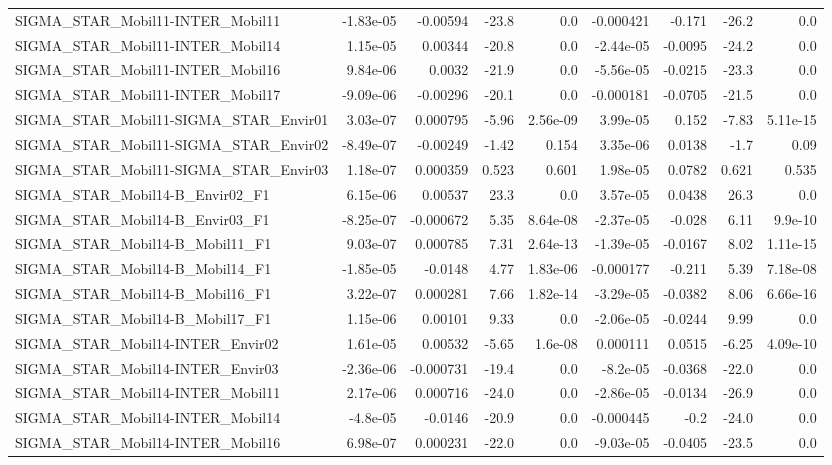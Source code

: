 \begin{tabular}{lrrrrrrrr}
SIGMA_STAR_Mobil11-INTER_Mobil11 & -1.83e-05 & -0.00594 & -23.8 & 0.0 & -0.000421 & -0.171 & -26.2 & 0.0 \\
SIGMA_STAR_Mobil11-INTER_Mobil14 & 1.15e-05 & 0.00344 & -20.8 & 0.0 & -2.44e-05 & -0.0095 & -24.2 & 0.0 \\
SIGMA_STAR_Mobil11-INTER_Mobil16 & 9.84e-06 & 0.0032 & -21.9 & 0.0 & -5.56e-05 & -0.0215 & -23.3 & 0.0 \\
SIGMA_STAR_Mobil11-INTER_Mobil17 & -9.09e-06 & -0.00296 & -20.1 & 0.0 & -0.000181 & -0.0705 & -21.5 & 0.0 \\
SIGMA_STAR_Mobil11-SIGMA_STAR_Envir01 & 3.03e-07 & 0.000795 & -5.96 & 2.56e-09 & 3.99e-05 & 0.152 & -7.83 & 5.11e-15 \\
SIGMA_STAR_Mobil11-SIGMA_STAR_Envir02 & -8.49e-07 & -0.00249 & -1.42 & 0.154 & 3.35e-06 & 0.0138 & -1.7 & 0.09 \\
SIGMA_STAR_Mobil11-SIGMA_STAR_Envir03 & 1.18e-07 & 0.000359 & 0.523 & 0.601 & 1.98e-05 & 0.0782 & 0.621 & 0.535 \\
SIGMA_STAR_Mobil14-B_Envir02_F1 & 6.15e-06 & 0.00537 & 23.3 & 0.0 & 3.57e-05 & 0.0438 & 26.3 & 0.0 \\
SIGMA_STAR_Mobil14-B_Envir03_F1 & -8.25e-07 & -0.000672 & 5.35 & 8.64e-08 & -2.37e-05 & -0.028 & 6.11 & 9.9e-10 \\
SIGMA_STAR_Mobil14-B_Mobil11_F1 & 9.03e-07 & 0.000785 & 7.31 & 2.64e-13 & -1.39e-05 & -0.0167 & 8.02 & 1.11e-15 \\
SIGMA_STAR_Mobil14-B_Mobil14_F1 & -1.85e-05 & -0.0148 & 4.77 & 1.83e-06 & -0.000177 & -0.211 & 5.39 & 7.18e-08 \\
SIGMA_STAR_Mobil14-B_Mobil16_F1 & 3.22e-07 & 0.000281 & 7.66 & 1.82e-14 & -3.29e-05 & -0.0382 & 8.06 & 6.66e-16 \\
SIGMA_STAR_Mobil14-B_Mobil17_F1 & 1.15e-06 & 0.00101 & 9.33 & 0.0 & -2.06e-05 & -0.0244 & 9.99 & 0.0 \\
SIGMA_STAR_Mobil14-INTER_Envir02 & 1.61e-05 & 0.00532 & -5.65 & 1.6e-08 & 0.000111 & 0.0515 & -6.25 & 4.09e-10 \\
SIGMA_STAR_Mobil14-INTER_Envir03 & -2.36e-06 & -0.000731 & -19.4 & 0.0 & -8.2e-05 & -0.0368 & -22.0 & 0.0 \\
SIGMA_STAR_Mobil14-INTER_Mobil11 & 2.17e-06 & 0.000716 & -24.0 & 0.0 & -2.86e-05 & -0.0134 & -26.9 & 0.0 \\
SIGMA_STAR_Mobil14-INTER_Mobil14 & -4.8e-05 & -0.0146 & -20.9 & 0.0 & -0.000445 & -0.2 & -24.0 & 0.0 \\
SIGMA_STAR_Mobil14-INTER_Mobil16 & 6.98e-07 & 0.000231 & -22.0 & 0.0 & -9.03e-05 & -0.0405 & -23.5 & 0.0 \\

\end{tabular}
